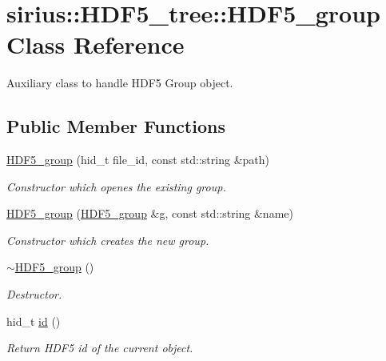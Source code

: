 \hypertarget{classsirius_1_1_h_d_f5__tree_1_1_h_d_f5__group}{}\section{sirius\+:\+:H\+D\+F5\+\_\+tree\+:\+:H\+D\+F5\+\_\+group Class Reference}
\label{classsirius_1_1_h_d_f5__tree_1_1_h_d_f5__group}


Auxiliary class to handle H\+D\+F5 Group object.  


\subsection*{Public Member Functions}
\begin{DoxyCompactItemize}
\item 
\hyperlink{classsirius_1_1_h_d_f5__tree_1_1_h_d_f5__group_ad0ca933da35b5e9255a9061cbe9ef71c}{H\+D\+F5\+\_\+group} (hid\+\_\+t file\+\_\+id, const std\+::string \&path)
\begin{DoxyCompactList}\small\item\em Constructor which openes the existing group. \end{DoxyCompactList}\item 
\hyperlink{classsirius_1_1_h_d_f5__tree_1_1_h_d_f5__group_a397afa1664b5a095dd9be7c8da445e9f}{H\+D\+F5\+\_\+group} (\hyperlink{classsirius_1_1_h_d_f5__tree_1_1_h_d_f5__group}{H\+D\+F5\+\_\+group} \&g, const std\+::string \&name)
\begin{DoxyCompactList}\small\item\em Constructor which creates the new group. \end{DoxyCompactList}\item 
\hyperlink{classsirius_1_1_h_d_f5__tree_1_1_h_d_f5__group_a0a5a195565bbeff557c09c89e9dc0e2b}{$\sim$\+H\+D\+F5\+\_\+group} ()
\begin{DoxyCompactList}\small\item\em Destructor. \end{DoxyCompactList}\item 
hid\+\_\+t \hyperlink{classsirius_1_1_h_d_f5__tree_1_1_h_d_f5__group_a1da8388352ec10efd9561288a08575f1}{id} ()
\begin{DoxyCompactList}\small\item\em Return H\+D\+F5 id of the current object. \end{DoxyCompactList}\end{DoxyCompactItemize}
